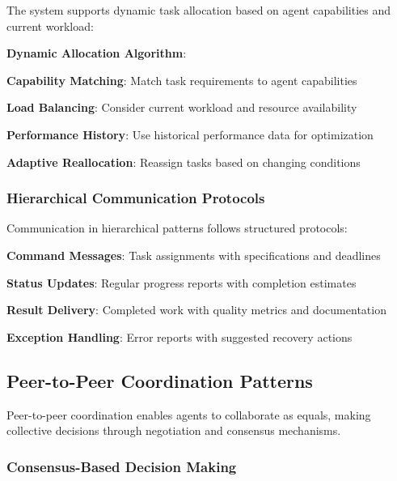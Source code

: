 The system supports dynamic task allocation based on agent capabilities and current workload:

\begin{successbox}
\textbf{Dynamic Allocation Algorithm}:
\begin{compactlist}
    \item \textbf{Capability Matching}: Match task requirements to agent capabilities
    \item \textbf{Load Balancing}: Consider current workload and resource availability
    \item \textbf{Performance History}: Use historical performance data for optimization
    \item \textbf{Adaptive Reallocation}: Reassign tasks based on changing conditions
\end{compactlist}
\end{successbox}

\subsubsection*{Hierarchical Communication Protocols}

Communication in hierarchical patterns follows structured protocols:

\begin{expandedlist}
    \item \textbf{Command Messages}: Task assignments with specifications and deadlines
    \item \textbf{Status Updates}: Regular progress reports with completion estimates
    \item \textbf{Result Delivery}: Completed work with quality metrics and documentation
    \item \textbf{Exception Handling}: Error reports with suggested recovery actions
\end{expandedlist}

\subsection*{Peer-to-Peer Coordination Patterns}

Peer-to-peer coordination enables agents to collaborate as equals, making collective decisions through negotiation and consensus mechanisms.

\subsubsection*{Consensus-Based Decision Making}

